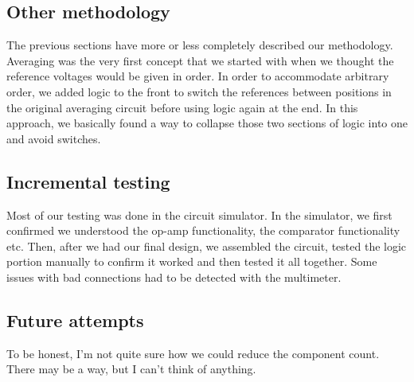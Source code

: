 \documentclass{article}
\begin{document}
\subsection{Other methodology}
The previous sections have more or less completely described our methodology. Averaging was the very first concept that we started with when we thought the reference voltages would be given in order. In order to accommodate arbitrary order, we added logic to the front to switch the references between positions in the original averaging circuit before using logic again at the end. In this approach, we basically found a way to collapse those two sections of logic into one and avoid switches.
\subsection{Incremental testing}
Most of our testing was done in the circuit simulator. In the simulator, we first confirmed we understood the op-amp functionality, the comparator functionality etc. Then, after we had our final design, we assembled the circuit, tested the logic portion manually to confirm it worked and then tested it all together. Some issues with bad connections had to be detected with the multimeter.
\subsection{Future attempts}
To be honest, I'm not quite sure how we could reduce the component count. There may be a way, but I can't think of anything.
\section{}
\end{document}

